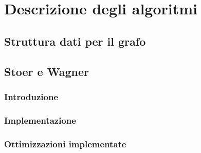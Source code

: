 \section{Descrizione degli algoritmi}

\subsection{Struttura dati per il grafo}


\subsection{Stoer e Wagner}

\subsubsection{Introduzione}

\subsubsection{Implementazione}

\subsubsection{Ottimizzazioni implementate}
